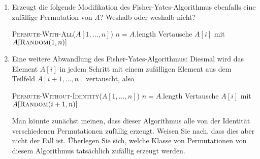 
\begin{exercise}

\phantom{}

\begin{enumerate}[label = \alph*)]
  \item Erzeugt die folgende Modifikation des Fisher-Yates-Algorithmus ebenfalls
  eine zufällige Permutation von $A$? Weshalb oder weshalb nicht?

  \begin{algorithmic}
      \State \textsc{Permute-With-All}($A[1,\dots,n]$)
      \State $n = A.$length
          \State Vertausche $A[i]$ mit $A[\textsc{Random}(1,n)]$
      \EndFor
  \end{algorithmic}

  \item Eine weitere Abwandlung des Fisher-Yates-Algorithmus: Diesmal wird das
  Element $A[i]$ in jedem Schritt mit einem zufälligen Element aus dem Teilfeld
  $A[i+1,\dots,n]$ vertauscht, also

  \begin{algorithmic}
    \State \textsc{Permute-Without-Identity}($A[1,\dots,n]$)
    \State $n = A.$length
      \State Vertausche $A[i]$ mit $A[\textsc{Random}(i+1,n)]$
    \EndFor
  \end{algorithmic}

  Man könnte zunächst meinen, dass dieser Algorithmus alle von der Identität
  verschiedenen Permutationen zufällig erzeugt. Weisen Sie nach, dass dies aber
  nicht der Fall ist. Überlegen Sie sich, welche Klasse von Permutationen von
  diesem Algorithmus tatsächlich zufällig erzeugt werden.
\end{enumerate}

\end{exercise}



